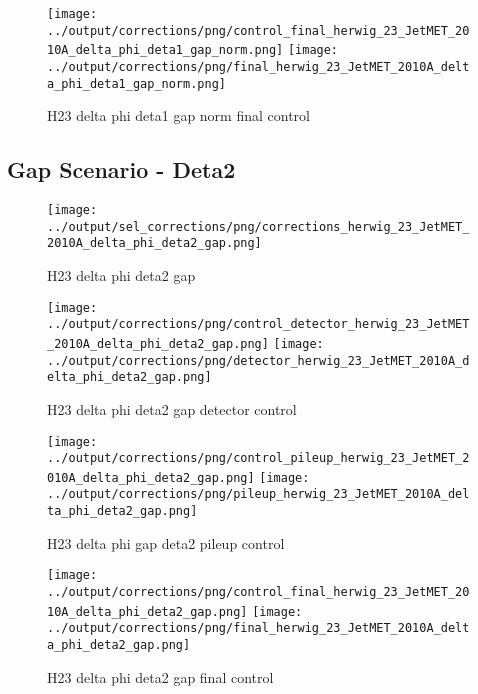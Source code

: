\documentclass[11pt]{book}
\begin{document}
\begin{figure}[ht]
\centering
\texttt{[image: ../output/corrections/png/control\_final\_herwig\_23\_JetMET\_2010A\_delta\_phi\_deta1\_gap\_norm.png]}
\texttt{[image: ../output/corrections/png/final\_herwig\_23\_JetMET\_2010A\_delta\_phi\_deta1\_gap\_norm.png]}
\caption{H23 delta phi deta1 gap norm final control}
\label{fig:H23_JetMET_2010A_delta_phi_deta1_gap_norm_final_control}
\end{figure}


\clearpage
\subsection{Gap Scenario - Deta2}
\begin{figure}[ht]
\centering
\texttt{[image: ../output/sel\_corrections/png/corrections\_herwig\_23\_JetMET\_2010A\_delta\_phi\_deta2\_gap.png]}
\caption{H23 delta phi deta2 gap}
\label{fig:H23_JetMET_2010A_delta_phi_deta2_gap}
\end{figure}

\begin{figure}[ht]
\centering
\texttt{[image: ../output/corrections/png/control\_detector\_herwig\_23\_JetMET\_2010A\_delta\_phi\_deta2\_gap.png]}
\texttt{[image: ../output/corrections/png/detector\_herwig\_23\_JetMET\_2010A\_delta\_phi\_deta2\_gap.png]}
\caption{H23 delta phi deta2 gap detector control}
\label{fig:H23_JetMET_2010A_delta_phi_deta2_gap_detector_control}
\end{figure}

\begin{figure}[ht]
\centering
\texttt{[image: ../output/corrections/png/control\_pileup\_herwig\_23\_JetMET\_2010A\_delta\_phi\_deta2\_gap.png]}
\texttt{[image: ../output/corrections/png/pileup\_herwig\_23\_JetMET\_2010A\_delta\_phi\_deta2\_gap.png]}
\caption{H23 delta phi gap deta2 pileup control}
\label{fig:H23_JetMET_2010A_delta_phi_deta2_gap_pileup_control}
\end{figure}


\begin{figure}[ht]
\centering
\texttt{[image: ../output/corrections/png/control\_final\_herwig\_23\_JetMET\_2010A\_delta\_phi\_deta2\_gap.png]}
\texttt{[image: ../output/corrections/png/final\_herwig\_23\_JetMET\_2010A\_delta\_phi\_deta2\_gap.png]}
\caption{H23 delta phi deta2 gap final control}
\label{fig:H23_JetMET_2010A_delta_phi_deta2_gap_final_control}
\end{figure}
\end{document}
